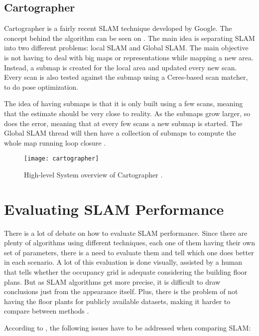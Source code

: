 \subsection{Cartographer}

Cartographer is a fairly recent SLAM technique developed by Google. The concept behind the algorithm can be seen on . The main idea is separating SLAM into two different problems: local SLAM and Global SLAM. The main objective is not having to deal with big maps or representations while mapping a new area. Instead, a submap is created for the local area and updated every new scan. Every scan is also tested against the submap using a Ceres-based scan matcher, to do pose optimization.

The idea of having submaps is that it is only built using a few scans, meaning that the estimate should be very close to reality. As the submaps grow larger, so does the error, meaning that at every few scans a new submap is started. The Global SLAM thread will then have a collection of submaps to compute the whole map running loop closure \cite{cartographer2016google}.

\begin{figure}[!ht]
    \centering
    \texttt{[image: cartographer]}
    \caption{High-level System overview of Cartographer \cite{cartographerimage}.}
    \label{fig:cartographer}
\end{figure}

\section{Evaluating SLAM Performance} \label{sec:evaluating}

There is a lot of debate on how to evaluate SLAM performance. Since there are plenty of algorithms using different techniques, each one of them having their own set of parameters, there is a need to evaluate them and tell which one does better in each scenario. A lot of this evaluation is done visually, assisted by a human that tells whether the occupancy grid is adequate considering the building floor plans. But as SLAM algorithms get more precise, it is difficult to draw conclusions just from the appearance itself. Plus, there is the problem of not having the floor plants for publicly available datasets, making it harder to compare between methods \cite{kummerle2009measuring}.

According to \citeauthor{amigoni2007good}, the following issues have to be addressed when comparing SLAM:

